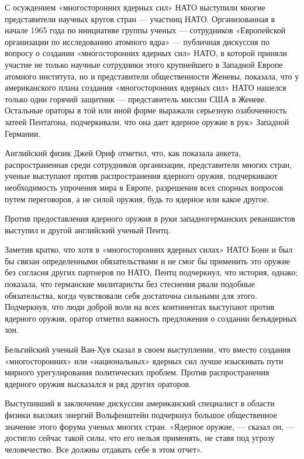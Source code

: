\documentclass[12pt, a4paper, openany]{book}
\begin{document}
	С осуждением «многосторонних ядерных сил» НАТО выступили многие представители научных кругов стран — участниц НАТО. Организованная в начале 1965 года по инициативе группы ученых — сотрудников «Европейской организации по исследованию атомного ядра» — публичная дискуссия по вопросу о создании «многосторонних ядерных сил» НАТО, в которой приняли участие не только научные сотрудники этого крупнейшего в Западной Европе атомного института, но и представители общественности Женевы, показала, что у американского плана создания «многосторонних ядерных сил» НАТО нашелся только один горячий защитник — представитель миссии США в Женеве. Остальные ораторы в той или иной форме выражали серьезную озабоченность затеей Пентагона, подчеркивали, что она дает ядерное оружие в рук» Западной Германии.
	
	Английский физик Джей Ориф отметил, что, как показала анкета, распространенная среди сотрудников организации, представители многих стран, ученые выступают против распространения ядерного оружия, подчеркивают необходимость упрочения мира в Европе, разрешения всех спорных вопросов путем переговоров, а не силой оружия, будь то ядерное или какое другое.
	
	Против предоставления ядерного оружия в руки западногерманских реваншистов выступил и другой английский ученый Пентц.
	
	Заметив кратко, что хотя в «многосторонних ядерных силах» НАТО Бонн и был бы связан определенными обязательствами и не смог бы применить это оружие без согласия других партнеров по НАТО, Пентц подчеркнул, что история, однако; показала, что германские милитаристы без стеснения рвали подобные обязательства, когда чувствовали себя достаточна сильными для этого. Подчеркнув, что люди доброй воли на всех континентах выступают против ядерного оружия, оратор отметил важность предложения о создании безъядерных зон.
	
	Бельгийский ученый Ван-Хув сказал в своем выступлении, что вместо создания «многосторонних» или «национальных» ядерных сил лучше изыскивать пути мирного урегулирования политических проблем. Против распространения ядерного оружия высказался и ряд других ораторов.
	
	Выступивший в заключение дискуссии американский специалист в области физики высоких энергий Вольфенштейн подчеркнул большое общественное значение этого форума ученых многих стран. «Ядерное оружие, — сказал он, — достигло сейчас такой силы, что его нельзя применять, не ставя под угрозу человечество. Все должны отдавать себе в этом отчет».
	
\end{document}
